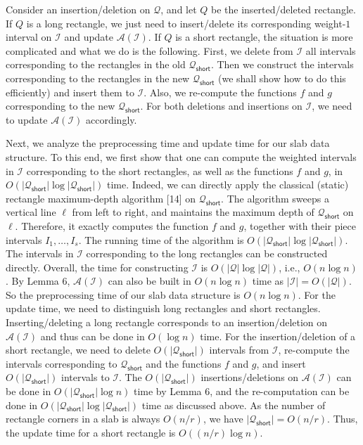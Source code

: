 \par
\par
Consider an insertion/deletion on $\mathcal{Q}$, and let $Q$ be the inserted/deleted rectangle. If $Q$ is a long rectangle, we just need to insert/delete its corresponding weight-$1$ interval on $\mathcal{I}$ and update $\mathcal{A}(\mathcal{I})$. If $Q$ is a short rectangle, the situation is more complicated and what we do is the following. First, we delete from $\mathcal{I}$ all intervals corresponding to the rectangles in the old $\mathcal{Q}_{\mathsf{short}}$. Then we construct the intervals corresponding to the rectangles in the new $\mathcal{Q}_{\mathsf{short}}$ (we shall show how to do this efficiently) and insert them to $\mathcal{I}$. Also, we re-compute the functions $f$ and $g$ corresponding to the new $\mathcal{Q}_{\mathsf{short}}$. For both deletions and insertions on $\mathcal{I}$, we need to update $\mathcal{A}(\mathcal{I})$ accordingly.
\par
\par
Next, we analyze the preprocessing time and update time for our slab data structure. To this end, we first show that one can compute the weighted intervals in $\mathcal{I}$ corresponding to the short rectangles, as well as the functions $f$ and $g$, in $O(|\mathcal{Q}_{\mathsf{short}}|\log|\mathcal{Q}_{\mathsf{short}}|)$ time. Indeed, we can directly apply the classical (static) rectangle maximum-depth algorithm [14] on $\mathcal{Q}_{\mathsf{short}}$. The algorithm sweeps a vertical line $\ell$ from left to right, and maintains the maximum depth of $\mathcal{Q}_{\mathsf{short}}$ on $\ell$. Therefore, it exactly computes the function $f$ and $g$, together with their piece intervals $I_{1},\dots,I_{s}$. The running time of the algorithm is $O(|\mathcal{Q}_{\mathsf{short}}|\log|\mathcal{Q}_{\mathsf{short}}|)$. The intervals in $\mathcal{I}$ corresponding to the long rectangles can be constructed directly. Overall, the time for constructing $\mathcal{I}$ is $O(|\mathcal{Q}|\log|\mathcal{Q}|)$, i.e., $O(n\log n)$. By Lemma 6, $\mathcal{A}(\mathcal{I})$ can also be built in $O(n\log n)$ time as $|\mathcal{I}|=O(|\mathcal{Q}|)$. So the preprocessing time of our slab data structure is $O(n\log n)$. For the update time, we need to distinguish long rectangles and short rectangles. Inserting/deleting a long rectangle corresponds to an insertion/deletion on $\mathcal{A}(\mathcal{I})$ and thus can be done in $O(\log n)$ time. For the insertion/deletion of a short rectangle, we need to delete $O(|\mathcal{Q}_{\mathsf{short}}|)$ intervals from $\mathcal{I}$, re-compute the intervals corresponding to $\mathcal{Q}_{\mathsf{short}}$ and the functions $f$ and $g$, and insert $O(|\mathcal{Q}_{\mathsf{short}}|)$ intervals to $\mathcal{I}$. The $O(|\mathcal{Q}_{\mathsf{short}}|)$ insertions/deletions on $\mathcal{A}(\mathcal{I})$ can be done in $O(|\mathcal{Q}_{\mathsf{short}}|\log n)$ time by Lemma 6, and the re-computation can be done in $O(|\mathcal{Q}_{\mathsf{short}}|\log|\mathcal{Q}_{\mathsf{short}}|)$ time as discussed above. As the number of rectangle corners in a slab is always $O(n/r)$, we have $|\mathcal{Q}_{\mathsf{short}}|=O(n/r)$. Thus, the update time for a short rectangle is $O((n/r)\log n)$.
